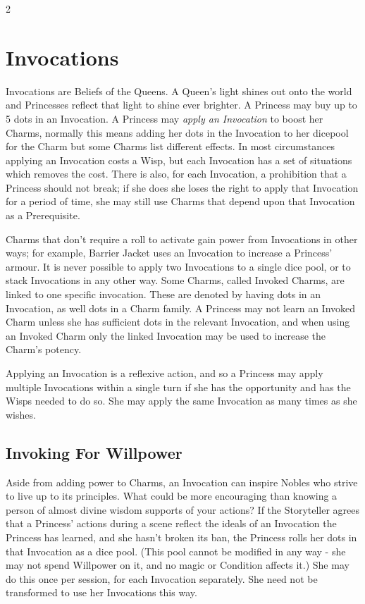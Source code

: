 \begin{multicols}{2}
\section*{Invocations}
\label{sec:Invocations}

Invocations are Beliefs of the Queens. A Queen's light shines out onto the world and Princesses reflect that light to shine ever brighter. A Princess may buy up to 5 dots in an Invocation. A Princess may \textit{apply an Invocation} to boost her Charms, normally this means adding her dots in the Invocation to her dicepool for the Charm but some Charms list different effects. In most circumstances applying an Invocation costs a Wisp, but each Invocation has a set of situations which removes the cost. There is also, for each Invocation, a prohibition that a Princess should not break; if she does she loses the right to apply that Invocation for a period of time, she may still use Charms that depend upon that Invocation as a Prerequisite.

Charms that don't require a roll to activate gain power from Invocations in other ways; for example, Barrier Jacket uses an Invocation to increase a Princess' armour. It is never possible to apply two Invocations to a single dice pool, or to stack Invocations in any other way. Some Charms, called Invoked Charms, are linked to one specific invocation. These are denoted by having dots in an Invocation, as well dots in a Charm family. A Princess may not learn an Invoked Charm unless she has sufficient dots in the relevant Invocation, and when using an Invoked Charm only the linked 
Invocation may be used to increase the Charm's potency. 

Applying an Invocation is a reflexive action, and so a Princess may apply multiple Invocations within a single turn if she has the opportunity and has the Wisps needed to do so. She may apply the same Invocation as many times as she wishes.

\subsection*{Invoking For Willpower}

Aside from adding power to Charms, an Invocation can inspire Nobles who strive to live up to its principles. What could be more encouraging than knowing a person of almost divine wisdom supports of your actions? If the Storyteller agrees that a Princess’ actions during a scene reflect the ideals of an Invocation the Princess has learned, and she hasn’t broken its ban, the Princess rolls her dots in that Invocation as a dice pool. (This pool cannot be modified in any way - she may not spend Willpower on it, and no magic or Condition affects it.) She may do this once per session, for each Invocation separately. She need not be transformed to use her Invocations this way.
 

\end{multicols}
